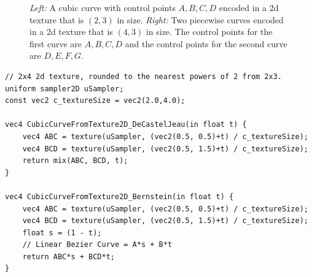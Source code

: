 \documentclass{jcgt}
\begin{document}
  \begin{figure}
    \hspace{5mm}
    \caption{\textit{Left:} A cubic curve with control points $A,B,C,D$ encoded in a 2d texture that is $(2,3)$ in size.  \textit{Right:} Two piecewise curves encoded in a 2d texture that is $(4,3)$ in size.  The control points for the first curve are $A,B,C,D$ and the control points for the second curve are $D,E,F,G$.} 
    \label{fig:texlayeout2d}
  \end{figure}  

\begin{lstlisting}[caption={GLSL for evaluating a cubic curve encoded in a $(2,4)$ pixel 2d texture.  Bilinear texture sampling used to evaluate the first two levesl of the De Casteljeau algorithm, then the process is continued both with the De Casteljeau algorithm, as well as the Bernstein form of a linear Bezier curve (lerp).}, label={lst:GLSLCubicTexture1D}]
// 2x4 2d texture, rounded to the nearest powers of 2 from 2x3.
uniform sampler2D uSampler; 
const vec2 c_textureSize = vec2(2.0,4.0);

vec4 CubicCurveFromTexture2D_DeCastelJeau(in float t) {
    vec4 ABC = texture(uSampler, (vec2(0.5, 0.5)+t) / c_textureSize);
    vec4 BCD = texture(uSampler, (vec2(0.5, 1.5)+t) / c_textureSize);
    return mix(ABC, BCD, t);
}

vec4 CubicCurveFromTexture2D_Bernstein(in float t) {
    vec4 ABC = texture(uSampler, (vec2(0.5, 0.5)+t) / c_textureSize);
    vec4 BCD = texture(uSampler, (vec2(0.5, 1.5)+t) / c_textureSize);
    float s = (1 - t);
    // Linear Bezier Curve = A*s + B*t
    return ABC*s + BCD*t;
}
\end{lstlisting}
\end{document}
